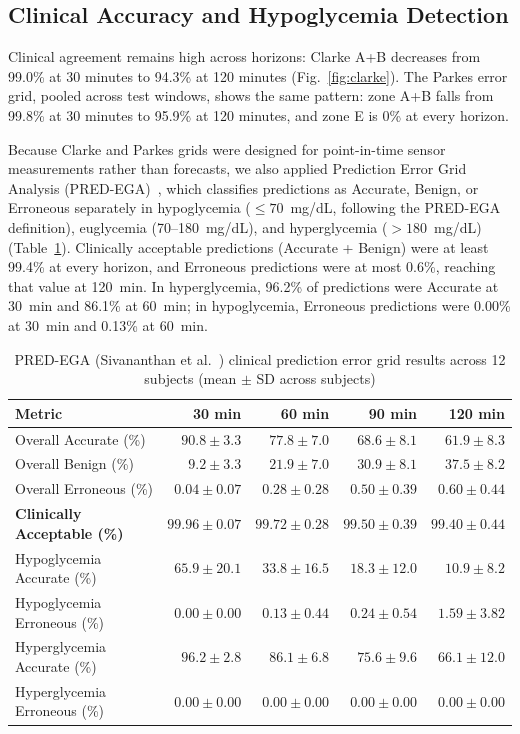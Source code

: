 \documentclass[journal]{IEEEtran}
\begin{document}
\subsection{Clinical Accuracy and Hypoglycemia Detection}

Clinical agreement remains high across horizons: Clarke A+B decreases from 99.0\% at 30 minutes to 94.3\% at 120 minutes (Fig.~\ref{fig:clarke}). The Parkes error grid, pooled across test windows, shows the same pattern: zone A+B falls from 99.8\% at 30 minutes to 95.9\% at 120 minutes, and zone E is 0\% at every horizon.

Because Clarke and Parkes grids were designed for point-in-time sensor measurements rather than forecasts, we also applied Prediction Error Grid Analysis (PRED-EGA)~\cite{ref53}, which classifies predictions as Accurate, Benign, or Erroneous separately in hypoglycemia ($\le 70$~mg/dL, following the PRED-EGA definition), euglycemia (70--180~mg/dL), and hyperglycemia ($> 180$~mg/dL) (Table~\ref{tab:predega}). Clinically acceptable predictions (Accurate + Benign) were at least 99.4\% at every horizon, and Erroneous predictions were at most 0.6\%, reaching that value at 120~min. In hyperglycemia, 96.2\% of predictions were Accurate at 30~min and 86.1\% at 60~min; in hypoglycemia, Erroneous predictions were 0.00\% at 30~min and 0.13\% at 60~min.

\begin{table}[t]
\centering
\caption{PRED-EGA (Sivananthan et al.~\cite{ref53}) clinical prediction error grid results across 12 subjects (mean $\pm$ SD across subjects)}
\label{tab:predega}
\footnotesize
\begin{tabular}{lrrrr}
\toprule
Metric & 30 min & 60 min & 90 min & 120 min \\
\midrule
Overall Accurate (\%) & $90.8 \pm 3.3$ & $77.8 \pm 7.0$ & $68.6 \pm 8.1$ & $61.9 \pm 8.3$ \\
Overall Benign (\%) & $9.2 \pm 3.3$ & $21.9 \pm 7.0$ & $30.9 \pm 8.1$ & $37.5 \pm 8.2$ \\
Overall Erroneous (\%) & $0.04 \pm 0.07$ & $0.28 \pm 0.28$ & $0.50 \pm 0.39$ & $0.60 \pm 0.44$ \\
\textbf{Clinically Acceptable (\%)} & $\mathbf{99.96 \pm 0.07}$ & $\mathbf{99.72 \pm 0.28}$ & $\mathbf{99.50 \pm 0.39}$ & $\mathbf{99.40 \pm 0.44}$ \\
\midrule
Hypoglycemia Accurate (\%) & $65.9 \pm 20.1$ & $33.8 \pm 16.5$ & $18.3 \pm 12.0$ & $10.9 \pm 8.2$ \\
Hypoglycemia Erroneous (\%) & $0.00 \pm 0.00$ & $0.13 \pm 0.44$ & $0.24 \pm 0.54$ & $1.59 \pm 3.82$ \\
Hyperglycemia Accurate (\%) & $96.2 \pm 2.8$ & $86.1 \pm 6.8$ & $75.6 \pm 9.6$ & $66.1 \pm 12.0$ \\
Hyperglycemia Erroneous (\%) & $0.00 \pm 0.00$ & $0.00 \pm 0.00$ & $0.00 \pm 0.00$ & $0.00 \pm 0.00$ \\
\bottomrule
\end{tabular}
\end{table}
\end{document}
